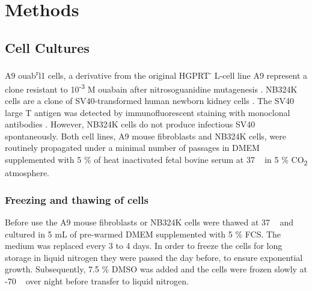 
\chapter{Methods} %

\label{Chapter2} %



\section{Cell Cultures}
A9 ouab\textsuperscript{r}l1 cells, a derivative from the original HGPRT\textsuperscript{-} L-cell line A9 represent a clone resistant to 10\textsuperscript{-3} M ouabain after nitrosoguanidine mutagenesis \cite{pmid14213660}.
NB324K cells are a clone of SV40-transformed  human newborn kidney cells \cite{pmid13911591}. The SV40 large T antigen was detected by immunofluorescent  staining with monoclonal antibodies \cite{pmid6169844}.  However, NB324K cells do not produce infectious SV40 spontaneously.
Both cell lines, A9 mouse fibroblasts and NB324K cells, were routinely propagated under a minimal number of passages in DMEM supplemented with 5 \% of heat inactivated fetal bovine serum at 37 \textcelsius~ in 5 \% CO\textsubscript{2} atmosphere.  


\subsection{Freezing and thawing of cells}
Before use the A9 mouse fibroblasts or NB324K cells were thawed at 37 \textcelsius~ and cultured in 5 mL of pre-warmed DMEM supplemented with 5 \% FCS. The medium was replaced every 3 to 4 days. 
In order to freeze the cells for long storage in liquid nitrogen they were passed the day before, to ensure exponential growth. Subsequently, 7.5 \% DMSO was added and the cells were frozen slowly at -70 \textcelsius~ over night before transfer to liquid nitrogen.


